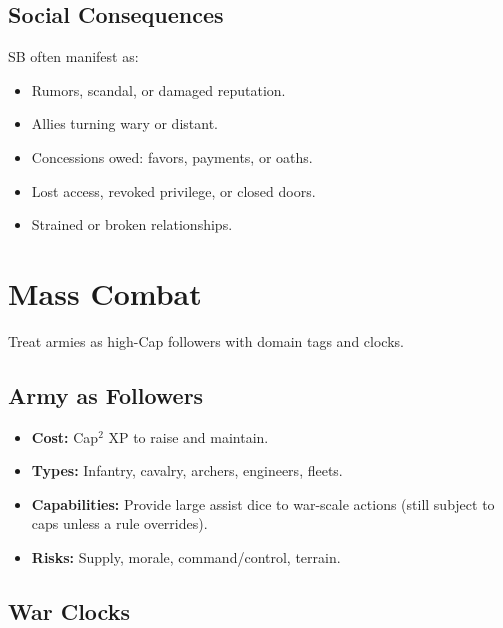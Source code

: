 \subsection{Social Consequences}
\label{subsec:social-consequences}

SB often manifest as:
\begin{itemize}
  \item Rumors, scandal, or damaged reputation. 
  \item Allies turning wary or distant. 
  \item Concessions owed: favors, payments, or oaths. 
  \item Lost access, revoked privilege, or closed doors. 
  \item Strained or broken relationships. 
\end{itemize}

\section{Mass Combat}
\label{sec:mass-combat}

Treat armies as high-Cap followers with domain tags and clocks.

\subsection{Army as Followers}
\label{subsec:army-followers}

\begin{itemize}
  \item \textbf{Cost:} Cap$^2$ XP to raise and maintain. 
  \item \textbf{Types:} Infantry, cavalry, archers, engineers, fleets.
  \item \textbf{Capabilities:} Provide large assist dice to war-scale actions (still subject to caps unless a rule overrides). 
  \item \textbf{Risks:} Supply, morale, command/control, terrain.
\end{itemize}

\subsection{War Clocks}
\label{subsec:war-clocks}

